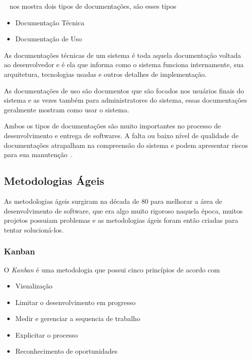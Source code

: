 \documentclass[12pt]{article}
\begin{document}
~\cite{Coelho_2009} nos mostra dois tipos de documentações, são esses tipos

\begin{itemize}
	\item Documentação Técnica
	\item Documentação de Uso
\end{itemize}

As documentações técnicas de um sistema é toda aquela documentação voltada ao desenvolvedor e é
ela que informa como o sistema funciona internamente, sua arquitetura, tecnologias usadas e outros detalhes de implementação.

As documentações de uso são documentos que são focados nos usuários finais do sistema e as vezes também para administratores do sistema,
essas documentações geralmente mostram como usar o sistema.

Ambos os tipos de documentações são muito importantes no processo de desenvolvimento e entrega de softwares. A falta ou
baixo nível de qualidade de documentações atrapalham na compreensão do sistema e podem apresentar
riscos para sua manutenção~\cite{deinvestigaccao}.

\subsection{Metodologias Ágeis}

As metodologias ágeis surgiram na década de 80 para melhorar a área de desenvolvimento de software,
que era algo muito rigoroso naquela época, muitos projetos possuiam problemas e as metodologias ágeis foram então
criadas para tentar solucioná-los.~\cite{Santos05}

\subsubsection{Kanban}

O \textit{Kanban} é uma metodologia que possui cinco princípios de acordo com~\cite{Agile06}
\begin{itemize}
  \item Visualização
  \item Limitar o desenvolvimento em progresso
  \item Medir e gerenciar a sequencia de trabalho
  \item Explicitar o processo
  \item Reconhecimento de oportunidades
\end{itemize}
\end{document}
